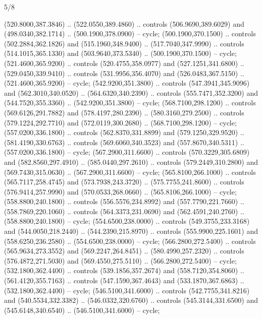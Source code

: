 \begin{flagdescription}{5/8}
\begin{scope}[shift={(0.5\flaglength,0.5\flagwidth)},scale=\flagwidth*\stretchfactor/820]
\begin{scope}[scale=1.84,xshift=-135mm,yshift=84mm]
\begin{scope}[y=0.80pt, x=0.80pt, yscale=-1, xscale=1]
\begin{scope}[cm={{1.01416,0.0,0.0,1.033,(-6.79641,-9.89449)}}]
\begin{scope}[draw=c24420e]
\begin{scope}[line width=0.131\lw]
\begin{scope}[fill=c67923d]
  (520.8000,387.3846) .. (522.0550,389.4860) .. controls (506.9690,389.6029) and
  (498.0340,382.1714) .. (500.1900,378.0900) -- cycle;
 (500.1900,370.1500) .. controls (502.2884,362.1826) and
  (515.1960,348.9400) .. (517.7040,347.9990) .. controls (514.1015,365.1330) and
  (503.9640,373.5340) .. (500.1900,370.1500) -- cycle;
 (521.4600,365.9200) .. controls (520.4755,358.0977) and
  (527.1251,341.6800) .. (529.0450,339.9410) .. controls (531.9956,356.4070) and
  (526.0483,367.5150) .. (521.4600,365.9200) -- cycle;
 (542.9200,351.3800) .. controls (547.3941,345.9096) and
  (562.3010,340.0520) .. (564.6320,340.2390) .. controls (555.7471,352.3200) and
  (544.7520,355.3360) .. (542.9200,351.3800) -- cycle;
 (568.7100,298.1200) .. controls (569.6126,291.7882) and
  (578.4197,280.2390) .. (580.3160,279.2500) .. controls (579.1224,292.7710) and
  (572.0119,300.2680) .. (568.7100,298.1200) -- cycle;
 (557.0200,336.1800) .. controls (562.8370,331.8899) and
  (579.1250,329.9520) .. (581.4190,330.6763) .. controls (569.6060,340.3523) and
  (557.8670,340.5311) .. (557.0200,336.1800) -- cycle;
 (567.2900,311.6600) .. controls (570.3229,305.6809) and
  (582.8560,297.4910) .. (585.0440,297.2610) .. controls (579.2449,310.2800) and
  (569.7430,315.0630) .. (567.2900,311.6600) -- cycle;
 (565.8100,266.1000) .. controls (565.7117,258.4745) and
  (573.7938,243.3720) .. (575.7755,241.8600) .. controls (576.9414,257.9990) and
  (570.0533,268.0660) .. (565.8106,266.1000) -- cycle;
 (558.8800,240.1800) .. controls (556.5576,234.8992) and
  (557.7790,221.7660) .. (558.7869,220.1060) .. controls (564.3373,231.0690) and
  (562.4591,240.2760) .. (558.8800,240.1800) -- cycle;
 (554.6500,238.0000) .. controls (549.3755,233.3168) and
  (544.0050,218.2440) .. (544.2390,215.8970) .. controls (555.9900,225.1601) and
  (558.6250,236.2580) .. (554.6500,238.0000) -- cycle;
 (566.2800,272.5400) .. controls (565.9634,273.3552) and
  (569.2247,264.8451) .. (580.4990,257.2320) .. controls (576.4872,271.5030) and
  (569.4550,275.5110) .. (566.2800,272.5400) -- cycle;
 (532.1800,362.4400) .. controls (539.1856,357.2674) and
  (558.7120,354.8060) .. (561.4120,355.7163) .. controls (547.1590,367.4643) and
  (533.1870,367.6863) .. (532.1800,362.4400) -- cycle;
 (546.5100,341.6000) .. controls (542.7755,341.8216) and
  (540.5534,332.3382) .. (546.0332,320.6760) .. controls (545.3144,331.6500) and
  (545.6148,340.6540) .. (546.5100,341.6000) -- cycle;

\end{scope}
\end{scope}
\end{scope}
\end{scope}
\end{scope}
\end{scope}
\end{scope}
\end{flagdescription}
